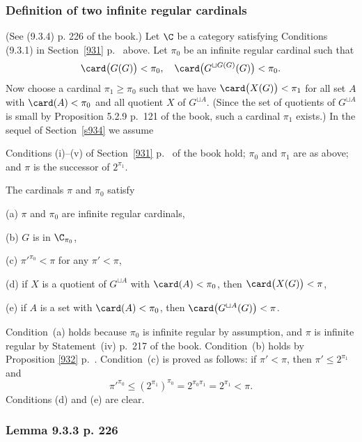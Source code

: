 \documentclass[12pt]{article}
\theoremstyle{remark}
\theoremstyle{definition}
\begin{document}

\subsubsection{Definition of two infinite regular cardinals}


(See (9.3.4) p. 226 of the book.) Let $\C$ be a category satisfying Conditions (9.3.1) in Section~\ref{931} p.~ above. Let $\pi_0$ be an infinite regular cardinal such that 
$$
\card\big(G(G)\big)<\pi_0,\quad\card\big(G^{\sqcup G(G)}(G)\big)<\pi_0.
$$ 
Now choose a cardinal $\pi_1\ge\pi_0$ such that we have $\card\big(X(G)\big)<\pi_1$ for all set $A$ with $\card(A)<\pi_0$ and all quotient $X$ of $G^{\sqcup A}$. (Since the set of quotients of $G^{\sqcup A}$ is small by Proposition 5.2.9 p.~121 of the book, such a cardinal $\pi_1$ exists.) In the sequel of Section~\ref{s934} we assume 

\begin{cond}
Conditions (i)--(v) of Section~\ref{931} p.~ of the book hold; $\pi_0$ and $\pi_1$ are as above; and $\pi$ is the successor of $2^{\pi_1}$.
\end{cond}

\nn The cardinals $\pi$ and $\pi_0$ satisfy 

(a) $\pi$ and $\pi_0$ are infinite regular cardinals,

(b) $G$ is in $\C_{\pi_0}$,

(c) $\pi'^{\pi_0}<\pi$ for any $\pi'<\pi$, 

(d) if $X$ is a quotient of $G^{\sqcup A}$ with $\card(A)<\pi_0$, then $\card\big(X(G)\big)<\pi$, 

(e) if $A$ is a set with $\card(A)<\pi_0$, then $\card\big(G^{\sqcup A}(G)\big)<\pi$.

\nn Condition~(a) holds because $\pi_0$ is infinite regular by assumption, and $\pi$ is infinite regular by Statement~(iv) p.~217 of the book. Condition~(b) holds by Proposition \ref{932} p.~. Condition~(c) is proved as follows: if $\pi'<\pi$, then $\pi'\le2^{\pi_1}$ and 
$$
\pi'^{\pi_0}\le(2^{\pi_1})^{\pi_0}=2^{\pi_0\pi_1}=2^{\pi_1}<\pi.
$$ 
Conditions (d) and (e) are clear. 

\subsubsection{Lemma 9.3.3 p. 226}
\end{document}
